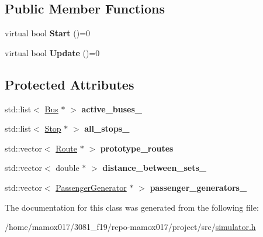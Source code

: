 \subsection*{Public Member Functions}
\begin{DoxyCompactItemize}
\item 
\mbox{\label{classSimulator_a0db68bef442ba6061a5f38189bbe3512}} 
virtual bool {\bfseries Start} ()=0
\item 
\mbox{\label{classSimulator_a7a5a1cbfa1e0cf9b82fe9d2e4b3b80ae}} 
virtual bool {\bfseries Update} ()=0
\end{DoxyCompactItemize}
\subsection*{Protected Attributes}
\begin{DoxyCompactItemize}
\item 
\mbox{\label{classSimulator_a2936ff199db47fac93a4ca2970a8bf9a}} 
std\+::list$<$ \hyperlink{classBus}{Bus} $\ast$ $>$ {\bfseries active\+\_\+buses\+\_\+}
\item 
\mbox{\label{classSimulator_aa5539319a6b4a70c2d0c6f6220fe44c7}} 
std\+::list$<$ \hyperlink{classStop}{Stop} $\ast$ $>$ {\bfseries all\+\_\+stops\+\_\+}
\item 
\mbox{\label{classSimulator_a5be4c046d8654aa28b37308f581c3fc9}} 
std\+::vector$<$ \hyperlink{classRoute}{Route} $\ast$ $>$ {\bfseries prototype\+\_\+routes}
\item 
\mbox{\label{classSimulator_aa14b28ce4f5c0fa6f9e96f9e3b9aae73}} 
std\+::vector$<$ double $\ast$ $>$ {\bfseries distance\+\_\+between\+\_\+sets\+\_\+}
\item 
\mbox{\label{classSimulator_a666884fa56160538fb7ceac476aedd44}} 
std\+::vector$<$ \hyperlink{classPassengerGenerator}{Passenger\+Generator} $\ast$ $>$ {\bfseries passenger\+\_\+generators\+\_\+}
\end{DoxyCompactItemize}


The documentation for this class was generated from the following file\+:\begin{DoxyCompactItemize}
\item 
/home/mamox017/3081\+\_\+f19/repo-\/mamox017/project/src/\hyperlink{simulator_8h}{simulator.\+h}\end{DoxyCompactItemize}
